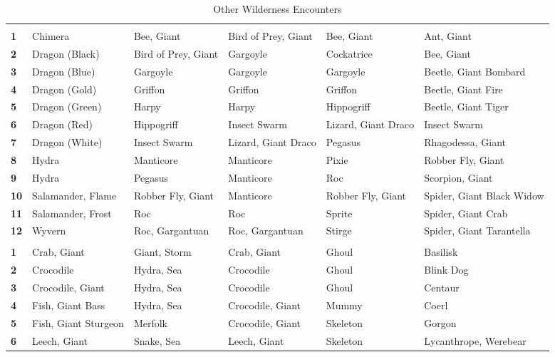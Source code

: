 \begin {table}[H]
  \caption{Other Wilderness Encounters}
  \begin{tabularx}{\columnwidth}{>{\bfseries}YYYYYY}
	 &  &  &  &  & \\
	1 & Chimera & Bee, Giant & Bird of Prey, Giant & Bee, Giant & Ant, Giant\\
	2 & Dragon (Black) & Bird of Prey, Giant & Gargoyle & Cockatrice & Bee, Giant\\
	3 & Dragon (Blue) & Gargoyle & Gargoyle & Gargoyle & Beetle, Giant Bombard\\
	4 & Dragon (Gold) & Griffon & Griffon & Griffon & Beetle, Giant Fire\\
	5 & Dragon (Green) & Harpy & Harpy & Hippogriff & Beetle, Giant Tiger\\
	6 & Dragon (Red) & Hippogriff & Insect Swarm & Lizard, Giant Draco & Insect Swarm\\
	7 & Dragon (White) & Insect Swarm & Lizard, Giant Draco & Pegasus & Rhagodessa, Giant\\
	8 & Hydra & Manticore & Manticore & Pixie & Robber Fly, Giant\\
	9 & Hydra & Pegasus & Manticore & Roc & Scorpion, Giant\\
	10 & Salamander, Flame & Robber Fly, Giant & Manticore & Robber Fly, Giant & Spider, Giant Black Widow\\
	11 & Salamander, Frost & Roc & Roc & Sprite & Spider, Giant Crab\\
	12 & Wyvern & Roc, Gargantuan & Roc, Gargantuan & Stirge & Spider, Giant Tarantella\\
	 &  &  &  &  & \\
	1 & Crab, Giant & Giant, Storm & Crab, Giant & Ghoul & Basilisk\\
	2 & Crocodile & Hydra, Sea & Crocodile & Ghoul & Blink Dog\\
	3 & Crocodile, Giant & Hydra, Sea & Crocodile & Ghoul & Centaur\\
	4 & Fish, Giant Bass & Hydra, Sea & Crocodile, Giant & Mummy & Coerl\\
	5 & Fish, Giant Sturgeon & Merfolk & Crocodile, Giant & Skeleton & Gorgon\\
	6 & Leech, Giant & Snake, Sea & Leech, Giant & Skeleton & Lycanthrope, Werebear\\

\end{tabularx}
\end{table}
